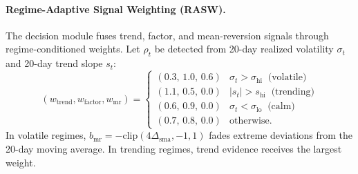 \paragraph{Regime-Adaptive Signal Weighting (RASW).}
The decision module fuses trend, factor, and mean-reversion signals through regime-conditioned weights. Let $\rho_t$ be detected from 20-day realized volatility $\sigma_t$ and 20-day trend slope $s_t$:
\begin{equation}
\label{eq:rasw}
(w_{\mathrm{trend}}, w_{\mathrm{factor}}, w_{\mathrm{mr}}) =
\begin{cases}
(0.3,\,1.0,\,0.6) & \sigma_t > \sigma_{\mathrm{hi}} \;\; \text{(volatile)} \\
(1.1,\,0.5,\,0.0) & |s_t| > s_{\mathrm{hi}} \;\; \text{(trending)} \\
(0.6,\,0.9,\,0.0) & \sigma_t < \sigma_{\mathrm{lo}} \;\; \text{(calm)} \\
(0.7,\,0.8,\,0.0) & \text{otherwise.}
\end{cases}
\end{equation}
In volatile regimes, $b_{\mathrm{mr}}=-\mathrm{clip}(4\Delta_{\mathrm{sma}},-1,1)$ fades extreme deviations from the 20-day moving average. In trending regimes, trend evidence receives the largest weight.

